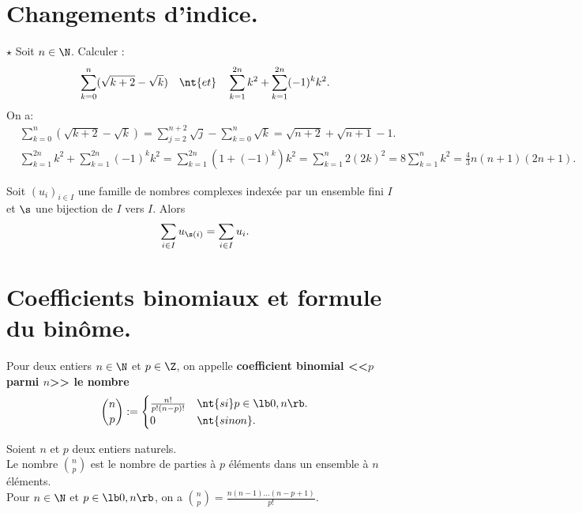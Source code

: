 \documentclass[11pt]{article}
\begin{document}
\section{Changements d'indice.}

\begin{ex}{$\star$}{}
    Soit $n\in\N$. Calculer :
    \begin{equation*}
        \sum_{k=0}^n(\sqrt{k+2}-\sqrt{k})\quad\nt{et}\quad\sum_{k=1}^{2n}k^2+\sum_{k=1}^{2n}(-1)^kk^2.
    \end{equation*}
    \tcblower
    On a:
    \begin{align*}
        &\sum_{k=0}^n(\sqrt{k+2}-\sqrt{k})=\sum_{j=2}^{n+2}\sqrt{j}-\sum_{k=0}^n\sqrt{k}=\sqrt{n+2}+\sqrt{n+1}-1.\\
        &\sum_{k=1}^{2n}k^2+\sum_{k=1}^{2n}(-1)^kk^2=\sum_{k=1}^{2n}(1+(-1)^k)k^2=\sum_{k=1}^{n}2(2k)^2=8\sum_{k=1}^nk^2=\frac{4}{3}n(n+1)(2n+1).
    \end{align*}
\end{ex}

\begin{prop}{}{}
    Soit $(u_i)_{i\in I}$ une famille de nombres complexes indexée par un ensemble fini $I$ et $\s$ une bijection de $I$ vers $I$. Alors
    \begin{equation*}
        \sum_{i\in I}u_{\s(i)}=\sum_{i\in I}u_i.
    \end{equation*}
\end{prop}

\section{Coefficients binomiaux et formule du binôme.}

\begin{defi}{}{}
    Pour deux entiers $n\in\N$ et $p\in\Z$, on appelle \bf{coefficient binomial} <<$p$ parmi $n$>> le nombre
    \begin{equation*}
        \binom{n}{p}:=\begin{cases}
            \frac{n!}{p!(n-p)!} &\nt{si } p\in\lb0,n\rb.\\
            0&\nt{sinon}.
        \end{cases}
    \end{equation*}
\end{defi}

\begin{prop}{}{}
    Soient $n$ et $p$ deux entiers naturels.\\
    Le nombre $\binom{n}{p}$ est le nombre de parties à $p$ éléments dans un ensemble à $n$ éléments.\\
    Pour $n\in\N$ et $p\in\lb0,n\rb$, on a \Large$\binom{n}{p}=\frac{n(n-1)...(n-p+1)}{p!}$.
\end{prop}
\end{document}
